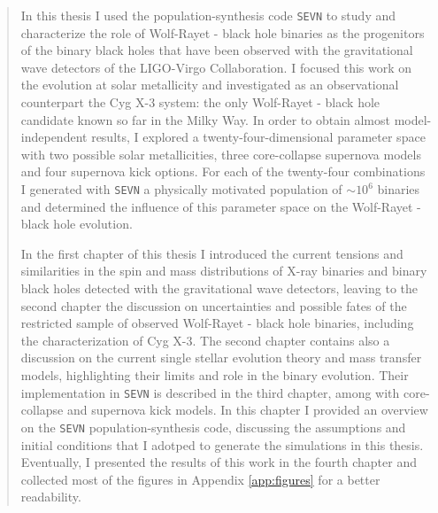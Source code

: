 \documentclass[a4paper,titlepage]{book}     	%
\newenvironment{abstract}{\newpage \thispagestyle{empty} \vspace*{3\baselineskip}
	\begin{center}\Large\textbf\abstractname\end{center}
	\begin{quotation}
	}{\end{quotation}\clearpage}
\begin{document}
\begin{abstract}%
In this thesis I used the population-synthesis code \texttt{SEVN} to study and characterize the role of Wolf-Rayet - black hole binaries as the progenitors of the binary black holes that have been observed with the gravitational wave detectors of the LIGO-Virgo Collaboration. I focused this work on the evolution at solar metallicity and investigated as an observational counterpart the Cyg X-3 system: the only Wolf-Rayet - black hole candidate known so far in the Milky Way. In order to obtain almost model-independent results, I explored a twenty-four-dimensional parameter space with two possible solar metallicities, three core-collapse supernova models and four supernova kick options. For each of the twenty-four combinations I generated with \texttt{SEVN} a physically motivated population of $\sim 10^6$ binaries and determined the influence of this parameter space on the Wolf-Rayet - black hole evolution.

In the first chapter of this thesis I introduced the current tensions and similarities in the spin and mass distributions of X-ray binaries and binary black holes detected with the gravitational wave detectors, leaving to the second chapter the discussion on uncertainties and possible fates of the restricted sample of observed Wolf-Rayet - black hole binaries, including the characterization of Cyg X-3. The second chapter contains also a discussion on the current single stellar evolution theory and mass transfer models, highlighting their limits and role in the binary evolution. Their implementation in \texttt{SEVN} is described in the third chapter, among with core-collapse and supernova kick models. In this chapter I provided an overview on the \texttt{SEVN} population-synthesis code, discussing the assumptions and initial conditions that I adotped to generate the simulations in this thesis. Eventually, I presented the results of this work in the fourth chapter and collected most of the figures in Appendix \ref{app:figures} for a better readability.
\end{abstract}

\tableofcontents
{}

\mainmatter

\end{document}
